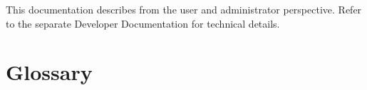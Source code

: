 This documentation describes \textan{} from the user and administrator
perspective. Refer to the separate Developer Documentation for technical
details.

\section{Glossary}

